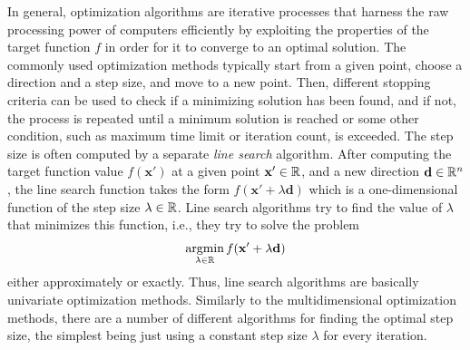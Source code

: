 \documentclass[a4paper,english,titlepage,12pt]{article}
\newcommand{\vect}[1]{\ensuremath{\mathbf{#1}}}
\newcommand{\R}{\ensuremath\mathbb{R}}
\begin{document}
In general, optimization algorithms are iterative processes that harness the raw processing power of computers efficiently by exploiting the properties of the target function $f$ in order for it to converge to an optimal solution.
The commonly used optimization methods typically start from a given point, choose a direction and a step size, and move to a new point. Then, different stopping criteria can be used to check if a minimizing solution has been found, and if not, the process is repeated until a minimum solution is reached or some other condition, such as maximum time limit or iteration count, is exceeded.
The step size is often computed by a separate \emph{line search} algorithm. After computing the target function value $f(\vect{x}')$ at a given point $\vect{x}'\in \R$, and a new direction $\vect{d}\in \R^n$, the line search function takes the form $f(\vect{x}' + \lambda \vect{d})$ which is a one-dimensional function of the step size $\lambda\in \R$. Line search algorithms try to find the value of $\lambda$ that minimizes this function, i.e., they try to solve the problem
\begin{equation}\label{eq:ls}
\mathop{\text{argmin}}_{\lambda\in \R} f(\vect{x}' + \lambda \vect{d})
\end{equation}
either approximately or exactly. Thus, line search algorithms are basically univariate optimization methods. Similarly to the multidimensional optimization methods, there are a number of different algorithms for finding the optimal step size, the simplest being just using a constant step size $\lambda$ for every iteration. 
\end{document}
